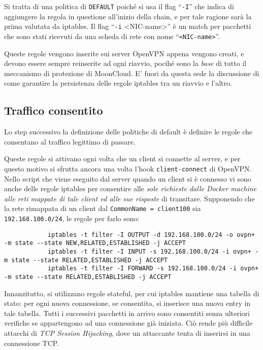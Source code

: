 		Si tratta di una politica di \texttt{DEFAULT} poiché si usa il flag ``\texttt{-I}''
		che indica di aggiungere la regola in questione all'inizio della chain, e per tale
		ragione sarà la prima valutata da iptables. Il flag ``\texttt{-i} <NIC-name>'' è un match
		per pacchetti che sono stati ricevuti da una scheda di rete con nome ``\texttt{<NIC-name>}''.
				
				
		Queste regole vengono inserite sui server OpenVPN appena vengono creati, e
		devono essere sempre reinserite ad ogni riavvio, pocihé sono la \textit{base}
		di tutto il meccanismo di protezione di MoonCloud. E' fuori da questa sede la discussione
		di come garantire la persistenza delle regole iptables tra un riavvio e l'altro.
				
				
		\subsection{Traffico consentito}
		Lo step successivo la definizione delle politiche di default è definire le regole che
		consentano al traffico legittimo di passare.
				
		Queste regole si attivano ogni volta che un client si connette al server, e per
		questo motivo si sfrutta ancora una volta l'hook \texttt{client-connect} di OpenVPN.
		Nello script che viene eseguito dal server quando un client si è connesso vi sono
		anche delle regole iptables per consentire alle \textit{sole richieste
		dalle Docker machine alle reti mappate di tale client ed alle sue risposte}
		di transitare.
		Supponendo che la rete rimappata di un client dal \texttt{CommonName = client100} sia
		\texttt{192.168.100.0/24}, le regole per farlo sono:
		\begin{verbatim}
			iptables -t filter -I OUTPUT -d 192.168.100.0/24 -o ovpn+ -m state --state NEW,RELATED,ESTABLISHED -j ACCEPT
			iptables -t filter -I INPUT -s 192.168.100.0/24 -i ovpn+ -m state --state RELATED,ESTABLISHED -j ACCEPT
			iptables -t filter -I FORWARD -s 192.168.100.0/24 -i ovpn+ -m state --state RELATED,ESTABLISHED -j ACCEPT
		\end{verbatim}
				
		Innanzitutto, si utilizzano regole stateful, per cui iptables mantiene
		una tabella di stato: per ogni nuova connessione, se consentita, si inserisce
		una nuova entry in tale tabella. Tutti i successivi pacchetti in arrivo sono consentiti
		senza ulteriori verifiche
		se appartengono ad una connessione già iniziata.
		Ciò rende più difficile
		attacchi di \textit{TCP Session Hijacking}, dove un attaccante tenta di inserirsi in
		una connessione TCP.
				
